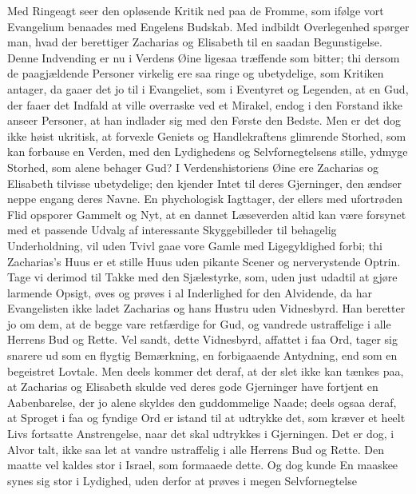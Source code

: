 \documentclass[12pt,a4paper]{book}
\begin{document}
Med Ringeagt seer den opløsende Kritik ned paa de Fromme, som
ifølge vort Evangelium benaades med Engelens Budskab. Med
indbildt Overlegenhed spørger man, hvad der berettiger Zacharias
og Elisabeth til en saadan Begunstigelse. Denne Indvending er nu
i Verdens Øine ligesaa træffende som bitter; thi dersom de
paagjældende Personer virkelig ere saa ringe og ubetydelige, som
Kritiken antager, da gaaer det jo til i Evangeliet, som i
Eventyret og Legenden, at en Gud, der faaer det Indfald at ville
overraske ved et Mirakel, endog i den Forstand ikke anseer
Personer, at han indlader sig med den Første den Bedste. Men er
det dog ikke høist ukritisk, at forvexle Geniets og
Handlekraftens glimrende Storhed, som kan forbause en Verden, med
den Lydighedens og Selvfornegtelsens stille, ydmyge Storhed, som
alene behager Gud? I Verdenshistoriens Øine ere Zacharias og
Elisabeth tilvisse ubetydelige; den kjender Intet til deres
Gjerninger, den ændser neppe engang deres Navne. En
phychologisk Iagttager, der ellers med ufortrøden Flid opsporer
Gammelt og Nyt, at en dannet Læseverden altid kan være forsynet
med et passende Udvalg af interessante Skyggebilleder til
behagelig Underholdning, vil uden Tvivl gaae vore Gamle med
Ligegyldighed forbi; thi Zacharias's Huus er et stille Huus uden
pikante Scener og nerverystende Optrin. Tage vi derimod til Takke
med den Sjælestyrke, som, uden just udadtil at gjøre larmende
Opsigt, øves og prøves i al Inderlighed for den Alvidende, da har
Evangelisten ikke ladet Zacharias og hans Hustru uden Vidnesbyrd.
Han beretter jo om dem, at de begge vare retfærdige for Gud, og
vandrede ustraffelige i alle Herrens Bud og
Rette. Vel sandt, dette Vidnesbyrd, affattet i faa Ord, tager sig
snarere ud som en flygtig Bemærkning, en forbigaaende Antydning,
end som en begeistret Lovtale. Men deels kommer det deraf, at der
slet ikke kan tænkes paa, at Zacharias og Elisabeth skulde ved
deres gode Gjerninger have fortjent en Aabenbarelse, der jo alene
skyldes den guddommelige Naade; deels ogsaa deraf, at Sproget i
faa og fyndige Ord er istand til at udtrykke det, som kræver et
heelt Livs fortsatte Anstrengelse, naar det skal udtrykkes i
Gjerningen. Det er dog, i Alvor talt, ikke saa let at vandre
ustraffelig i alle Herrens Bud og Rette. Den maatte vel kaldes
stor i Israel, som formaaede dette. Og dog kunde En maaskee synes
sig stor i Lydighed, uden derfor at prøves i megen Selvfornegtelse
\end{document}
